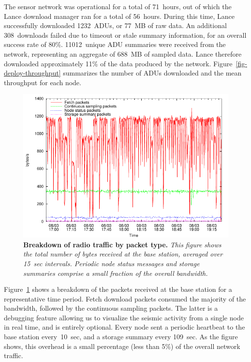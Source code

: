 The sensor network was operational for a total of 71~hours, out of
which the Lance download manager ran for a total of 56~hours. 
During this time, Lance successfully downloaded 1232~ADUs, or 77~MB of 
raw data. An additional 308~downloads failed due to timeout or stale summary 
information, for an overall success rate of 80\%. 
11012~unique ADU summaries were received from the network,
representing an aggregate of 688~MB of sampled data. Lance therefore
downloaded approximately 11\% of the data produced by the network.
Figure~\ref{fig-deploy-throughput} summarizes the number of ADUs
downloaded and the mean throughput for each node. 


\begin{figure}[t]
\begin{center}
\includegraphics[width=0.9\hsize]{./figs/deploy/packetgraph/packetgraph.pdf}
\end{center}
\caption{\small {\bf Breakdown of radio traffic by packet type.}
{\em This figure shows the total number of bytes received at the base 
station, averaged over 15~sec intervals. Periodic node status messages
and storage summaries comprise a small fraction of the overall
bandwidth.}}
\label{fig-packetgraph}
\end{figure}

Figure~\ref{fig-packetgraph} shows a breakdown of the packets received
at the base station for a representative time period.
Fetch download packets consumed the majority of
the bandwidth, followed by the continuous sampling packets.
The latter is a debugging feature allowing us to visualize the
seismic activity from a single node in real time, and is entirely optional.
Every node sent a periodic heartbeat to the base station every~10~sec,
and a storage summary every 109~sec. As the figure shows, this
overhead is a small percentage (less than 5\%) of the overall network
traffic. 

